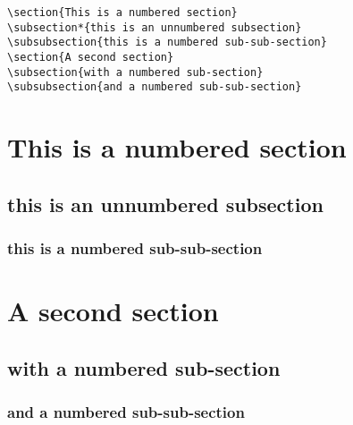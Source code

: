 \documentclass[12pt,a4paper]{article}
\begin{document}
\begin{verbatim}
\section{This is a numbered section}
\subsection*{this is an unnumbered subsection}
\subsubsection{this is a numbered sub-sub-section}
\section{A second section}
\subsection{with a numbered sub-section}
\subsubsection{and a numbered sub-sub-section}
\end{verbatim}
\section{This is a numbered section}
\subsection*{this is an unnumbered subsection}
\subsubsection{this is a numbered sub-sub-section}
\section{A second section}
\subsection{with a numbered sub-section}
\subsubsection{and a numbered sub-sub-section}
\end{document}

